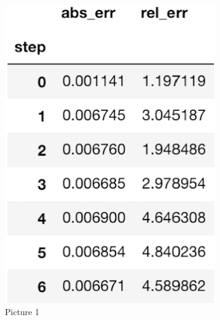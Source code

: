 \documentclass{article}%
\begin{document}
\iffalse
\begin{figure}
  \begin{subfigure}[b]{0.35\textwidth}
    \includegraphics[width=\textwidth]{err_step.png}
    \caption{Picture 1}
    \label{fig:1}
  \end{subfigure}
  \begin{subfigure}[b]{0.6\textwidth}

\end{subfigure}
\end{figure}
\end{document}
